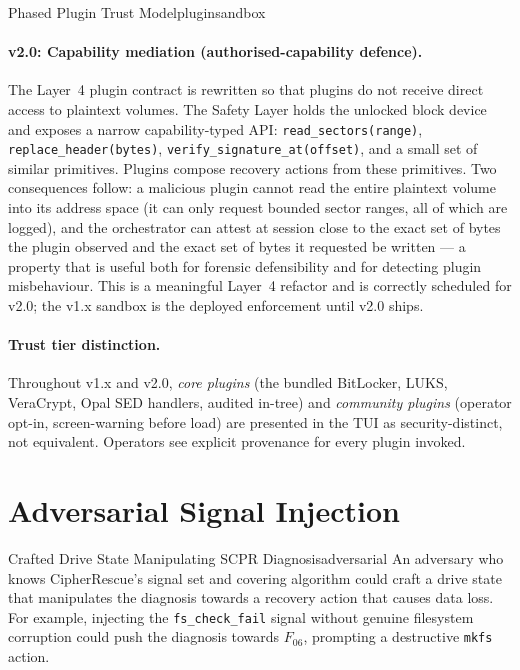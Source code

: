 \documentclass[11pt,a4paper]{report}
\begin{document}
\begin{solution}{Phased Plugin Trust Model}{pluginsandbox}
\paragraph{v2.0: Capability mediation (authorised-capability defence).}
\label{sec:pluginv2}
The Layer~4 plugin contract is rewritten so that plugins do not receive direct access to plaintext volumes. The Safety Layer holds the unlocked block device and exposes a narrow capability-typed API: \texttt{read\_sectors(range)}, \texttt{replace\_header(bytes)}, \texttt{verify\_signature\_at(offset)}, and a small set of similar primitives. Plugins compose recovery actions from these primitives. Two consequences follow: a malicious plugin cannot read the entire plaintext volume into its address space (it can only request bounded sector ranges, all of which are logged), and the orchestrator can attest at session close to the exact set of bytes the plugin observed and the exact set of bytes it requested be written --- a property that is useful both for forensic defensibility and for detecting plugin misbehaviour. This is a meaningful Layer~4 refactor and is correctly scheduled for v2.0; the v1.x sandbox is the deployed enforcement until v2.0 ships.

\paragraph{Trust tier distinction.} Throughout v1.x and v2.0, \emph{core plugins} (the bundled BitLocker, LUKS, VeraCrypt, Opal SED handlers, audited in-tree) and \emph{community plugins} (operator opt-in, screen-warning before load) are presented in the TUI as security-distinct, not equivalent. Operators see explicit provenance for every plugin invoked.
\end{solution}

\section{Adversarial Signal Injection}

\begin{edgecase}{Crafted Drive State Manipulating SCPR Diagnosis}{adversarial}
An adversary who knows CipherRescue's signal set and covering algorithm could craft a drive state that manipulates the diagnosis towards a recovery action that causes data loss. For example, injecting the \texttt{fs\_check\_fail} signal without genuine filesystem corruption could push the diagnosis towards $F_{06}$, prompting a destructive \texttt{mkfs} action.
\end{edgecase}
\end{document}
